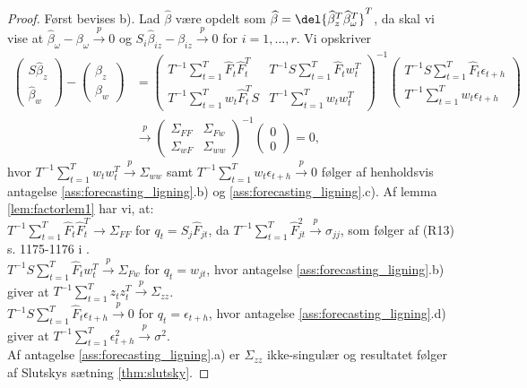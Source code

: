 \begin{proof}
Først bevises b). 
Lad \(\widehat{\beta}\) være opdelt som \(\widehat{\beta} = \del{\widehat{\beta}_z^T \widehat{\beta}_\omega^T}^T\), da skal vi vise at \(\widehat{\beta}_\omega - \beta_\omega \overset{p}{\rightarrow} 0\) og \(S_i \widehat{\beta}_{iz} - \beta_{iz} \overset{p}{\rightarrow} 0\) for \(i = 1, \ldots, r\).
Vi opskriver
\begin{align*}
\begin{pmatrix}
S \widehat{\beta}_z \\ \widehat{\beta}_w
\end{pmatrix} - \begin{pmatrix}
\beta_z \\ \beta_w
\end{pmatrix} &= \begin{pmatrix}
T^{-1} \sum_{t=1}^T \widehat{F}_t \widehat{F}_t^T & T^{-1} S \sum_{t=1}^T \widehat{F}_t w_t^T \\
T^{-1} \sum_{t=1}^T w_t \widehat{F}_t^T S & T^{-1} \sum_{t=1}^T w_t w_t^T
\end{pmatrix}^{-1} \begin{pmatrix}
T^{-1} S \sum_{t=1}^T \widehat{F}_t \epsilon_{t+h} \\
T^{-1} \sum_{t=1}^T w_t \epsilon_{t+h}
\end{pmatrix} \\
&\overset{p}{\rightarrow} \begin{pmatrix}
\Sigma_{FF} & \Sigma_{Fw} \\ \Sigma_{wF} & \Sigma_{ww}   
\end{pmatrix}^{-1} \begin{pmatrix}
0 \\ 0
\end{pmatrix} = 0,
\end{align*}
hvor 
\(T^{-1} \sum_{t=1}^T w_t w_t^T \overset{p}{\rightarrow} \Sigma_{ww}\) samt \(T^{-1} \sum_{t=1}^T w_t \epsilon_{t+h} \overset{p}{\rightarrow} 0\) følger af henholdsvis antagelse \ref{ass:forecasting_ligning}.b) og \ref{ass:forecasting_ligning}.c).
Af lemma \ref{lem:factorlem1} har vi, at: \\
 \(T^{-1} \sum_{t=1}^T \widehat{F}_t \widehat{F}_t^T \rightarrow \Sigma_{FF}\) for \(q_t = S_j \widehat{F}_{jt}\), da \(T^{-1} \sum_{t=1}^T \widehat{F}_{jt}^2 \overset{p}{\rightarrow} \sigma_{jj}\), som følger af (R13) s. 1175-1176 i \citep{stock_watson_2002a}. \\
\(T^{-1} S \sum_{t=1}^T \widehat{F}_t w_t^T \overset{p}{\rightarrow} \Sigma_{Fw}\) for \(q_t = w_{jt}\), hvor antagelse \ref{ass:forecasting_ligning}.b) giver at \(T^{-1} \sum_{t=1}^T z_t z_t^T \overset{p}{\rightarrow} \Sigma_{zz}\). \\
\(T^{-1} S \sum_{t=1}^T \widehat{F}_t \epsilon_{t+h} \overset{p}{\rightarrow} 0\) for \(q_t = \epsilon_{t+h}\), hvor antagelse \ref{ass:forecasting_ligning}.d) giver at \(T^{-1} \sum_{t=1}^T \epsilon_{t+h}^2 \overset{p}{\rightarrow} \sigma^2\). \\
Af antagelse \ref{ass:forecasting_ligning}.a) er \(\Sigma_{zz}\) ikke-singulær og resultatet følger af Slutskys sætning \ref{thm:slutsky}.


\end{proof}
